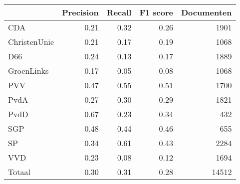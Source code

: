 \begin{tabular}{lrrrr}
\toprule
{} &  Precision &  Recall &  F1 score &  Documenten \\
\midrule
CDA          &       0.21 &    0.32 &      0.26 &        1901 \\
ChristenUnie &       0.21 &    0.17 &      0.19 &        1068 \\
D66          &       0.24 &    0.13 &      0.17 &        1889 \\
GroenLinks   &       0.17 &    0.05 &      0.08 &        1068 \\
PVV          &       0.47 &    0.55 &      0.51 &        1700 \\
PvdA         &       0.27 &    0.30 &      0.29 &        1821 \\
PvdD         &       0.67 &    0.23 &      0.34 &         432 \\
SGP          &       0.48 &    0.44 &      0.46 &         655 \\
SP           &       0.34 &    0.61 &      0.43 &        2284 \\
VVD          &       0.23 &    0.08 &      0.12 &        1694 \\
Totaal       &       0.30 &    0.31 &      0.28 &       14512 \\
\bottomrule
\end{tabular}
